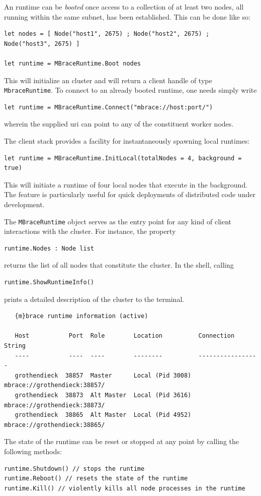 An \mbrace{} runtime can be \emph{booted} once access to a collection of at least two nodes,
all running within the same subnet, has been established. This can be done like so:
\begin{lstlisting}
let nodes = [ Node("host1", 2675) ; Node("host2", 2675) ; Node("host3", 2675) ]

let runtime = MBraceRuntime.Boot nodes
\end{lstlisting}
This will initialize an \mbrace{} cluster and will return a client handle of type
\texttt{MbraceRuntime}. 
%
To connect to an already booted \mbrace{} runtime, one needs simply write
\begin{lstlisting}
let runtime = MBraceRuntime.Connect("mbrace://host:port/")
\end{lstlisting}
wherein the supplied uri can point to any of the constituent worker nodes.

The client stack provides a facility for instantaneously spawning local runtimes:
\begin{lstlisting}
let runtime = MBraceRuntime.InitLocal(totalNodes = 4, background = true)
\end{lstlisting}
This will initiate a runtime of four local nodes that execute in the background.
The feature is particularly useful for quick deployments of distributed code under development.

The \texttt{MBraceRuntime} object serves as the entry point for any kind of client interactions 
with the cluster. For instance, the property
\begin{lstlisting}
runtime.Nodes : Node list
\end{lstlisting}
returns the list of all nodes that constitute the cluster.
In the \mbrace{} shell, calling
\begin{lstlisting}
runtime.ShowRuntimeInfo()
\end{lstlisting}
prints a detailed description of the cluster to the terminal.
\begin{verbatim}
   {m}brace runtime information (active)                                               

   Host           Port  Role        Location          Connection String            
   ----           ----  ----        --------          -----------------            
   grothendieck  38857  Master      Local (Pid 3008)  mbrace://grothendieck:38857/ 
   grothendieck  38873  Alt Master  Local (Pid 3616)  mbrace://grothendieck:38873/ 
   grothendieck  38865  Alt Master  Local (Pid 4952)  mbrace://grothendieck:38865/ 
\end{verbatim}
The state of the runtime can be reset or stopped at any point by calling the following methods:
\begin{lstlisting}
runtime.Shutdown() // stops the runtime
runtime.Reboot() // resets the state of the runtime
runtime.Kill() // violently kills all node processes in the runtime
\end{lstlisting}

